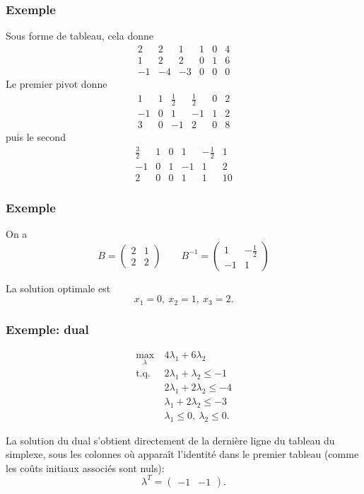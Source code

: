 \documentclass[usepdftitle=false]{beamer}
\begin{document}
\begin{frame}
\frametitle{Exemple}

Sous forme de tableau, cela donne
\[
\begin{matrix}
2 & 2 & 1 & 1 & 0 & 4 \\
1 & 2 & 2 & 0 & 1 & 6 \\
-1 & -4 & -3 & 0 & 0 & 0
\end{matrix}
\]
Le premier pivot donne
\[
\begin{matrix}
1 & 1 & \frac{1}{2} & \frac{1}{2} & 0 & 2 \\
-1 & 0 & 1 & -1 & 1 & 2 \\
3 & 0 & -1 & 2 & 0 & 8
\end{matrix}
\]
puis le second
\[
\begin{matrix}
\frac{3}{2} & 1 & 0 & 1 & -\frac{1}{2} & 1 \\
-1 & 0 & 1 & -1 & 1 & 2 \\
2 & 0 & 0 & 1 & 1 & 10
\end{matrix}
\]

\end{frame}

\begin{frame}
\frametitle{Exemple}

On a
\[
B = \begin{pmatrix}
2 & 1 \\
2 & 2
\end{pmatrix}
\qquad
B^{-1} = \begin{pmatrix}
1 & -\frac{1}{2} \\
-1 & 1
\end{pmatrix}
\]

\mbox{}

La solution optimale est
\[
x_1 = 0,\ x_2 = 1,\ x_3 = 2.
\]

\end{frame}

\begin{frame}
\frametitle{Exemple: dual}

\begin{align*}
\max_{\lambda}\ & 4\lambda_1 + 6\lambda_2 \\
\mbox{t.q. } & 2\lambda_1 + \lambda_2 \leq -1 \\
& 2\lambda_1 + 2\lambda_2 \leq -4 \\
& \lambda_1 + 2\lambda_2 \leq -3 \\
& \lambda_1 \leq 0, \ \lambda_2 \leq 0.
\end{align*}

\mbox{}

La solution du dual s'obtient directement de la dernière ligne du tableau du simplexe, sous les colonnes où apparaît l'identité dans le premier tableau (comme les coûts initiaux associés sont nuls):
\[
\lambda^T = \begin{pmatrix} -1 & -1 \end{pmatrix}.
\]

\end{frame}
\end{document}
